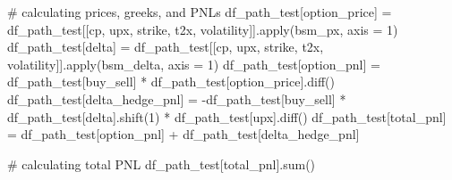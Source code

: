 \documentclass[
  letterpaper,
  DIV=11,
  numbers=noendperiod]{scrreprt}
\newenvironment{Shaded}{\begin{snugshade}}{\end{snugshade}}
\newcommand{\BuiltInTok}[1]{\textcolor[rgb]{0.00,0.23,0.31}{#1}}
\newcommand{\CommentTok}[1]{\textcolor[rgb]{0.37,0.37,0.37}{#1}}
\newcommand{\DecValTok}[1]{\textcolor[rgb]{0.68,0.00,0.00}{#1}}
\newcommand{\NormalTok}[1]{\textcolor[rgb]{0.00,0.23,0.31}{#1}}
\newcommand{\OperatorTok}[1]{\textcolor[rgb]{0.37,0.37,0.37}{#1}}
\newcommand{\StringTok}[1]{\textcolor[rgb]{0.13,0.47,0.30}{#1}}
\begin{document}
\begin{Shaded}
\begin{Highlighting}[]
\CommentTok{\# calculating prices, greeks, and PNLs}
\NormalTok{df\_path\_test[}\StringTok{\textquotesingle{}option\_price\textquotesingle{}}\NormalTok{] }\OperatorTok{=}\NormalTok{ df\_path\_test[[}\StringTok{\textquotesingle{}cp\textquotesingle{}}\NormalTok{, }\StringTok{\textquotesingle{}upx\textquotesingle{}}\NormalTok{, }\StringTok{\textquotesingle{}strike\textquotesingle{}}\NormalTok{, }\StringTok{\textquotesingle{}t2x\textquotesingle{}}\NormalTok{, }\StringTok{\textquotesingle{}volatility\textquotesingle{}}\NormalTok{]].}\BuiltInTok{apply}\NormalTok{(bsm\_px, axis }\OperatorTok{=} \DecValTok{1}\NormalTok{)}
\NormalTok{df\_path\_test[}\StringTok{\textquotesingle{}delta\textquotesingle{}}\NormalTok{] }\OperatorTok{=}\NormalTok{ df\_path\_test[[}\StringTok{\textquotesingle{}cp\textquotesingle{}}\NormalTok{, }\StringTok{\textquotesingle{}upx\textquotesingle{}}\NormalTok{, }\StringTok{\textquotesingle{}strike\textquotesingle{}}\NormalTok{, }\StringTok{\textquotesingle{}t2x\textquotesingle{}}\NormalTok{, }\StringTok{\textquotesingle{}volatility\textquotesingle{}}\NormalTok{]].}\BuiltInTok{apply}\NormalTok{(bsm\_delta, axis }\OperatorTok{=} \DecValTok{1}\NormalTok{)}
\NormalTok{df\_path\_test[}\StringTok{\textquotesingle{}option\_pnl\textquotesingle{}}\NormalTok{] }\OperatorTok{=}\NormalTok{  df\_path\_test[}\StringTok{\textquotesingle{}buy\_sell\textquotesingle{}}\NormalTok{] }\OperatorTok{*}\NormalTok{ df\_path\_test[}\StringTok{\textquotesingle{}option\_price\textquotesingle{}}\NormalTok{].diff()}
\NormalTok{df\_path\_test[}\StringTok{\textquotesingle{}delta\_hedge\_pnl\textquotesingle{}}\NormalTok{] }\OperatorTok{=} \OperatorTok{{-}}\NormalTok{df\_path\_test[}\StringTok{\textquotesingle{}buy\_sell\textquotesingle{}}\NormalTok{] }\OperatorTok{*}\NormalTok{ df\_path\_test[}\StringTok{\textquotesingle{}delta\textquotesingle{}}\NormalTok{].shift(}\DecValTok{1}\NormalTok{) }\OperatorTok{*}\NormalTok{ df\_path\_test[}\StringTok{\textquotesingle{}upx\textquotesingle{}}\NormalTok{].diff()}
\NormalTok{df\_path\_test[}\StringTok{\textquotesingle{}total\_pnl\textquotesingle{}}\NormalTok{] }\OperatorTok{=}\NormalTok{ df\_path\_test[}\StringTok{\textquotesingle{}option\_pnl\textquotesingle{}}\NormalTok{] }\OperatorTok{+}\NormalTok{ df\_path\_test[}\StringTok{\textquotesingle{}delta\_hedge\_pnl\textquotesingle{}}\NormalTok{]}

\CommentTok{\# calculating total PNL}
\NormalTok{df\_path\_test[}\StringTok{\textquotesingle{}total\_pnl\textquotesingle{}}\NormalTok{].}\BuiltInTok{sum}\NormalTok{()}
\end{Highlighting}
\end{Shaded}
\end{document}
